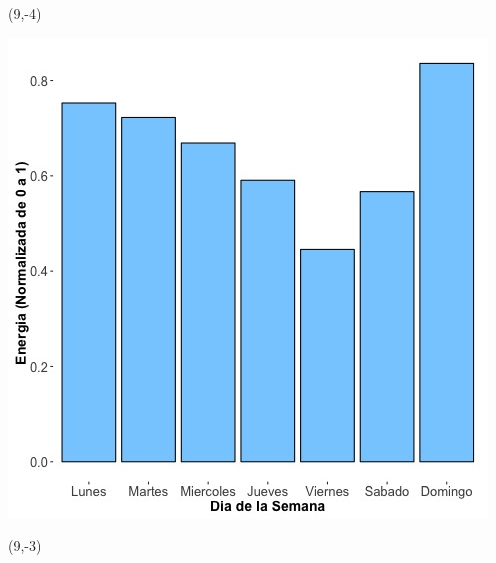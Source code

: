 \documentclass{article}\usepackage[]{graphicx}\usepackage[]{color}
\newenvironment{knitrout}{}{} %
\begin{document}
 \begin{textblock}{1}(9,-4)
\begin{minipage}{20em}
\begingroup

\endgroup
\end{minipage}
\end{textblock}


\begin{knitrout}
\color{fgcolor}
\includegraphics[scale=0.65]{figure/A20_day_of_week_plot} 
\end{knitrout}


 \begin{textblock}{1}(9,-3)
\begin{minipage}{20em}
\begingroup

\endgroup
\end{minipage}
\end{textblock}
\end{document}

